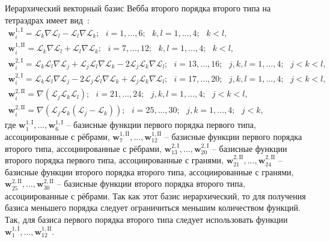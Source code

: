 \documentclass[a4paper,14pt]{article}
\begin{document}
Иерархический векторный базис Вебба второго порядка второго типа на тетраэдрах имеет вид~\citep{mikhajlova}:
\begin{equation}
	\begin{matrix}
		\displaystyle
		\mathbf{w}_{i}^{1,\mathrm{I}} = \mathcal{L}_k \nabla \mathcal{L}_l - \mathcal{L}_l \nabla \mathcal{L}_k ;
		\scriptstyle
		\text{~~} i = 1, ..., 6 ; \text{~~} k, l = 1, ..., 4 ; \text{~~} k < l ,\\
		\displaystyle
		\mathbf{w}_{i}^{1,\mathrm{II}} = \mathcal{L}_k \nabla \mathcal{L}_l + \mathcal{L}_l \nabla \mathcal{L}_k ;
		\scriptstyle
		\text{~~} i = 7, ..., 12 ; \text{~~} k, l = 1, ..., 4 ; \text{~~} k < l ,\\
		\displaystyle
		\mathbf{w}_{i}^{2,\mathrm{I}} = \mathcal{L}_k \mathcal{L}_l \nabla \mathcal{L}_j + \mathcal{L}_j \mathcal{L}_l \nabla \mathcal{L}_k - 2 \mathcal{L}_j \mathcal{L}_k \nabla \mathcal{L}_l ;
		\scriptstyle
		\text{~~} i = 13, ..., 16 ; \text{~~} j, k, l = 1, ..., 4 ; \text{~~} j < k < l ,\\
		\displaystyle
		\mathbf{w}_{i}^{2,\mathrm{I}} = \mathcal{L}_k \mathcal{L}_l \nabla \mathcal{L}_j - 2 \mathcal{L}_j \mathcal{L}_l \nabla \mathcal{L}_k + \mathcal{L}_j \mathcal{L}_k \nabla \mathcal{L}_l ;
		\scriptstyle
		\text{~~} i = 17, ..., 20 ; \text{~~} j, k, l = 1, ..., 4 ; \text{~~} j < k < l ,\\
		\displaystyle
		\mathbf{w}_{i}^{2,\mathrm{II}} = \nabla ( \mathcal{L}_j \mathcal{L}_k \mathcal{L}_l ) ;
		\scriptstyle
		\text{~~} i = 21, ..., 24 ; \text{~~} j, k, l = 1, ..., 4 ; \text{~~} j < k < l ,\\
		\displaystyle
		\mathbf{w}_{i}^{2,\mathrm{II}} = \nabla ( \mathcal{L}_j \mathcal{L}_k ( \mathcal{L}_j - \mathcal{L}_k ) ) ;
		\scriptstyle
		\text{~~} i = 25, ..., 30 ; \text{~~} j, k = 1, ..., 4 ; \text{~~} j < k ,
	\end{matrix}
	\label{eq:basis}
\end{equation}
где $\mathbf{w}_{1}^{1,\mathrm{I}}, ..., \mathbf{w}_{6}^{1,\mathrm{I}}$ -- базисные функции первого порядка первого типа, ассоциированные с рёбрами, $\mathbf{w}_{7}^{1,\mathrm{II}}, ..., \mathbf{w}_{12}^{1,\mathrm{II}}$ -- базисные функции первого порядка второго типа, ассоциированные с рёбрами, $\mathbf{w}_{13}^{2,\mathrm{I}}, ..., \mathbf{w}_{20}^{2,\mathrm{I}}$ -- базисные функции второго порядка первого типа, ассоциированные с гранями, $\mathbf{w}_{21}^{2,\mathrm{II}}, ..., \mathbf{w}_{24}^{2,\mathrm{II}}$ -- базисные функции второго порядка второго типа, ассоциированные с гранями, $\mathbf{w}_{25}^{2,\mathrm{II}}, ..., \mathbf{w}_{30}^{2,\mathrm{II}}$ -- базисные функции второго порядка второго типа, ассоциированные с рёбрами. Так как этот базис иерархический, то для получения базиса меньшего порядка следует ограничиться меньшим количеством функций. Так, для базиса первого порядка второго  типа следует использовать функции $\mathbf{w}_{1}^{1,\mathrm{I}}, ..., \mathbf{w}_{12}^{1,\mathrm{II}}$.
\end{document}
